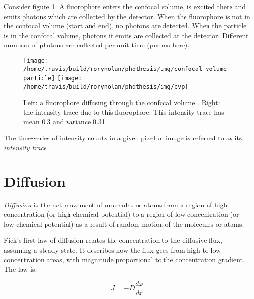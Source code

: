 \documentclass[12pt,]{book}
\theoremstyle{definition}
\theoremstyle{definition}
\theoremstyle{definition}
\theoremstyle{remark}
\let\BeginKnitrBlock\begin \let\EndKnitrBlock\end
\begin{document}
Consider figure \ref{fig:confocal-volume-particle}. A fluorophore enters
the confocal volume, is excited there and emits photons which are
collected by the detector. When the fluorophore is not in the confocal
volume (start and end), no photons are detected. When the particle is in
the confocal volume, photons it emits are collected at the detector.
Different numbers of photons are collected per unit time (per ms here).






\begin{figure}

\texttt{[image: /home/travis/build/rorynolan/phdthesis/img/confocal\_volume\_particle]} \texttt{[image: /home/travis/build/rorynolan/phdthesis/img/cvp]} \hfill{}

\caption{Left: a fluorophore diffusing
through the confocal volume \citep{sphd}. Right: the intensity trace due
to this fluorophore. This intensity trace has mean 0.3 and variance
0.31.}\label{fig:confocal-volume-particle}
\end{figure}

\BeginKnitrBlock{definition}
\protect\hypertarget{def:unnamed-chunk-9}{}{\label{def:unnamed-chunk-9} }The
time-series of intensity counts in a given pixel or image is referred to
as its \emph{intensity trace}.
\EndKnitrBlock{definition}

\section{Diffusion}\label{diffusion}

\BeginKnitrBlock{definition}
\protect\hypertarget{def:unnamed-chunk-10}{}{\label{def:unnamed-chunk-10}
}\emph{Diffusion} is the net movement of molecules or atoms from a
region of high concentration (or high chemical potential) to a region of
low concentration (or low chemical potential) as a result of random
motion of the molecules or atoms.
\EndKnitrBlock{definition}

Fick's first law of diffusion relates the concentration to the diffusive
flux, assuming a steady state. It describes how the flux goes from high
to low concentration areas, with magnitude proportional to the
concentration gradient. The law is:

\begin{equation}
J = -D\frac{d\varphi}{dx}
\label{eq:ficksfirst}
\end{equation}
\end{document}
